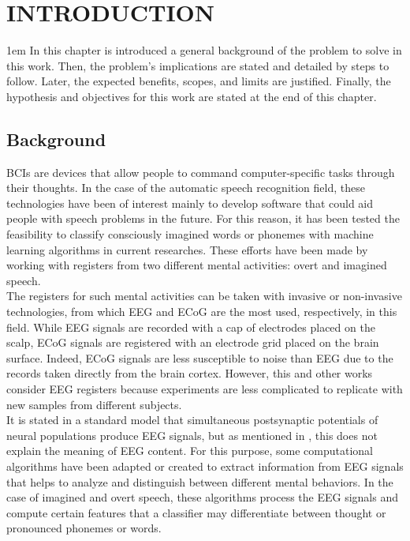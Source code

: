 \chapter[INTRODUCTION]{\huge INTRODUCTION}
\baselineskip 1em
In this chapter is introduced a general background of the problem to solve in this work. Then, the problem's implications are stated and detailed by steps to follow. Later, the expected benefits, scopes, and limits are justified. Finally, the hypothesis and objectives for this work are stated at the end of this chapter.

\section{Background}
BCIs are devices that allow people to command computer-specific tasks through their thoughts. In the case of the automatic speech recognition field, these technologies have been of interest mainly to develop software that could aid people with speech problems in the future. For this reason, it has been tested the feasibility to classify consciously imagined words or phonemes with machine learning algorithms in current researches. These efforts have been made by working with registers from two different mental activities: overt and imagined speech.\\

The registers for such mental activities can be taken with invasive or non-invasive technologies, from which EEG and ECoG are the most used, respectively, in this field. While EEG signals are recorded with a cap of electrodes placed on the scalp, ECoG signals are registered with an electrode grid placed on the brain surface. Indeed, ECoG signals are less susceptible to noise than EEG due to the records taken directly from the brain cortex. However, this and other works consider EEG registers because experiments are less complicated to replicate with new samples from different subjects.\\

It is stated in a standard model that simultaneous postsynaptic potentials of neural populations produce EEG signals, but as mentioned in \cite{cohen2017does}, this does not explain the meaning of EEG content. For this purpose, some computational algorithms have been adapted or created to extract information from EEG signals that helps to analyze and distinguish between different mental behaviors. In the case of imagined and overt speech, these algorithms process the EEG signals and compute certain features that a classifier may differentiate between thought or pronounced phonemes or words.\\

